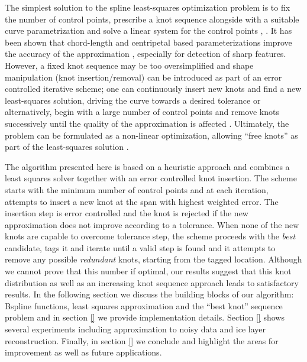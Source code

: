 \documentclass[a4paper,12pt]{article}
\begin{document}
  The simplest solution to the spline least-squares optimization problem is to fix the number of control points,
  prescribe a knot sequence alongside with a suitable curve parametrization and solve a linear system for the 
  control points \cite[Ch. 5.4]{nurbs_book}, \cite{deboor1968}. It has been shown that
    chord-length and centripetal based parameterizations 
    improve the accuracy of the approximation \cite{hoschek1988,speer1998,lee1989, ma1995}, especially for detection of sharp features. 
  However, a fixed knot sequence may be too oversimplified and 
  shape manipulation (knot insertion/removal) \cite{piegl1989, boehm1980, goldman1992} 
   can be introduced as part of an error controlled iterative scheme; 
   one can continuously insert new knots and find a new least-squares solution, 
   driving the curve towards a desired tolerance \cite{piegl2000, park2007} or alternatively, 
     begin with a large number of control points and remove knots successively until the 
     quality of the approximation is affected \cite{lyche1987, nurbsbook}. 
   Ultimately, the problem can be formulated as a non-linear optimization, allowing 
   ``free knots'' as part of the least-squares solution \cite{schwetlick1995least, beliakov2004}.

   The algorithm presented here is based on a heuristic approach and combines 
   a least squares solver together with an error controlled knot insertion. 
   The scheme starts with the minimum number of control points and at each iteration, 
  attempts to insert a new knot at the span with highest weighted error. The insertion step 
  is error controlled and the knot is rejected if the new approximation 
  does not improve according to a tolerance. 
   When none of the new knots are capable to overcome tolerance step, 
   the scheme proceeds with the \emph{best} candidate, tags it and iterate until a valid step is found and 
   it attempts to remove any possible \emph{redundant} knots, starting from the tagged location. 
  Although we cannot prove that this number if optimal, 
  our results suggest that this knot distribution as well as an increasing knot sequence approach 
   leads to satisfactory results. In the following section we discuss the building blocks of our algorithm:  
   Bspline functions, least squares approximation and the ``best knot'' sequence problem and in 
  section \ref{} we provide implementation details. Section \ref{} shows several experiments including 
   approximation to noisy data and ice layer reconstruction. Finally, 
   in section \ref{}  we conclude and highlight the areas for improvement as well as future applications.
 
\end{document}
